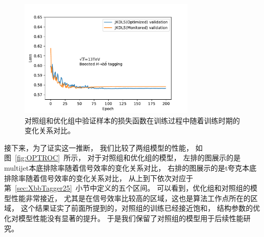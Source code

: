 \begin{figure}
  \begin{center}
    \includegraphics[width=0.75\textwidth]{figuresXbb/LossCOM.pdf}
  \end{center}
  \caption{
对照组和优化组中验证样本的损失函数在训练过程中随着训练时期的变化关系对比。
  }
    \label{fig:LOSSC}
\end{figure}

接下来，为了证实这一推断，
我们比较了两组模型的性能，
如图~\ref{fig:OPTROC}~所示，
对于对照组和优化组的模型，
左排的图展示的是multijet本底排除率随着信号效率的变化关系对比，
右排的图展示的是t夸克本底排除率随着信号效率的变化关系对比，
从上到下依次对应于第~\ref{sec:XbbTagger25}~小节中定义的五个区间。
可以看到，优化组和对照组的模型性能非常接近，
尤其是在信号效率比较高的区域，这也是算法工作点所在的区域，
这个结果证实了前面所提到的，对照组的训练已经接近饱和，
结构参数的优化对模型性能没有显著的提升。
于是我们保留了对照组的模型用于后续性能研究。

